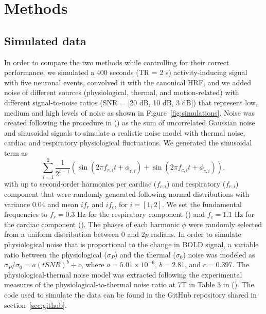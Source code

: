 
\section{Methods}
\label{sec:data}

\subsection{Simulated data}

In order to compare the two methods while controlling for their correct performance, we simulated a 400 seconds (TR = 2 s) activity-inducing signal with five neuronal events, convolved it with the canonical HRF, and we added noise of different sources (physiological, thermal, and motion-related) with different signal-to-noise ratios (SNR = [20 dB, 10 dB, 3 dB]) that represent low, medium and high levels of noise as shown in Figure~\ref{fig:simulations}. Noise was created following the procedure in (\citealt{caballerogaudes2013ParadigmFreeMapping}) as the sum of uncorrelated Gaussian noise and sinusoidal signals to simulate a realistic noise model with thermal noise, cardiac and respiratory physiological fluctuations. We generated the sinusoidal term as
\begin{equation}
    \sum_{i=1}^{2} \frac{1}{2^{i-1}}\left(\sin \left(2 \pi f_{r, i} t+\phi_{\mathrm{r}, i}\right)+\sin \left(2 \pi f_{c, i} t+\phi_{c, i}\right)\right),
\end{equation}
with up to second-order harmonics per cardiac (\(f_{c,i}\)) and respiratory (\(f_{r,i}\)) component that were randomly generated following normal distributions with variance 0.04 and mean \(if_r\) and \(if_c\), for \(i = [1, 2]\). We set the fundamental frequencies to \(f_r = 0.3\) Hz for the respiratory component (\citealt{birn2006separating}) and \(f_c = 1.1\) Hz for the cardiac component (\citealt{shmueli2007low}). The phases of each harmonic \(\phi\) were randomly selected from a uniform distribution between \(0\) and \(2p\) radians. In order to simulate physiological noise that is proportional to the change in BOLD signal, a variable ratio between the physiological (\(\sigma_P\)) and the thermal (\(\sigma_0\)) noise was modeled as \(\sigma_P/\sigma_0 = a(tSNR)^b + c\), where \(a = 5.01 \times 10^{-6}\), \(b = 2.81\), and \(c = 0.397\). The physiological-thermal noise model was extracted following the experimental measures of the physiological-to-thermal noise ratio at 7T in Table 3 in (\citealt{triantafyllou2005comparison}). The code used to simulate the data can be found in the GitHub repository shared in section~\ref{sec:github}.

